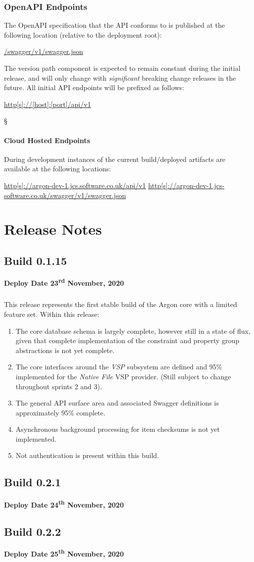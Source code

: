 \documentclass{book}
\begin{document}
\subsection{OpenAPI Endpoints}
The OpenAPI specification that the API conforms to is published at the following location (relative to the deployment root):
\begin{center}
    \url{/swagger/v1/swagger.json}
\end{center}
The version path component is expected to remain constant during the initial release, and will only change with \textit{significant} breaking change releases in the future.
All initial API endpoints will be prefixed as follows:
\begin{center}
    \url{http[s]://[host]:[port]/api/v1}
\end{center}§
\subsubsection{Cloud Hosted Endpoints}
During development instances of the current build/deployed artifacts are available at the following locations:
\begin{center}
    \url{http[s]://argon-dev-1.jcs.software.co.uk/api/v1}
    \url{http[s]://argon-dev-1.jcs-software.co.uk/swagger/v1/swagger.json}
\end{center}
\chapter{Release Notes}
\section{Build 0.1.15}
\textbf{Deploy Date 23\textsuperscript{rd} November, 2020}
\paragraph{}
This release represents the first stable build of the Argon core with a limited feature set.  Within this release:
\begin{enumerate}
    \item The core database schema is largely complete, however still in a state of flux, given that complete implementation of the constraint and property group abstractions is not yet complete.
    \item The core interfaces around the \textit{VSP} subsystem are defined and 95\% implemented for the \textit{Native File} VSP provider.  (Still subject to change throughout sprints 2 and 3).
    \item The general API surface area and associated Swagger definitions is approximately 95\% complete.
    \item Asynchronous background processing for item checksums is not yet implemented.
    \item Not authentication is present within this build. 
\end{enumerate}
\section{Build 0.2.1}
\textbf{Deploy Date 24\textsuperscript{th} November, 2020}
\section{Build 0.2.2}
\textbf{Deploy Date 25\textsuperscript{th} November, 2020}
\end{document}
